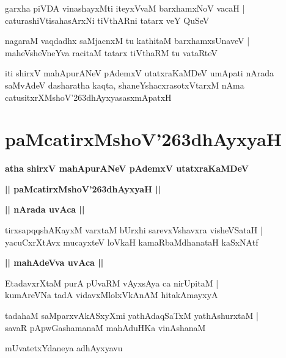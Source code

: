 \documentclass[twoside,12pt,openright]{book}
\def\S{\char'263}
\newcounter{shloka}[chapter]
\def\uvaca#1{\centerline{{\large\textbf{#1}}}}
\begin{document}
\begin{shloka}%
garxha piVDA vinashayxMti iteyxVvaM barxhamxNoV vacaH |\\
caturashiVtisahasArxNi tiVthARni tatarx veY QuSeV
\end{shloka}

\begin{shloka}%
nagaraM vaqdadhx saMjacnxM tu kathitaM barxhamxsUnaveV |\\
maheVsheVneYva racitaM tatarx tiVthaRM tu vataRteV
\end{shloka}

\begin{center}
iti shirxV mahApurANeV pAdemxV utatxraKaMDeV umApati nArada saMvAdeV  
dasharatha kaqta, shaneYshacxrasotxVtarxM nAma catusitxrXMshoV\S dhAyxyasasxmApatxH
\end{center}

\chapter{paMcatirxMshoV\S dhAyxyaH}

\begin{center}
{\LARGE\bfseries atha shirxV mahApurANeV pAdemxV utatxraKaMDeV}
\end{center}

\begin{center}
{\LARGE\bfseries || paMcatirxMshoV\S dhAyxyaH ||}
\end{center}

\uvaca{|| nArada uvAca ||}

\begin{shloka}%
tirxsapqqshAKayxM varxtaM bUrxhi sarevxVshavxra visheVSataH |\\
yacuCxrXtAvx mucayxteV loVkaH kamaRbaMdhanataH kaSxNAtf
\end{shloka}

\uvaca{|| mahAdeVva uvAca ||}

\begin{shloka}%
EtadavxrXtaM purA pUvaRM vAyxsAya ca nirUpitaM |\\
kumAreVNa tadA vidavxMlolxVkAnAM hitakAmayxyA
\end{shloka}

\begin{shloka}%
tadahaM saMparxvAkASxyXmi yathAdaqSaTxM yathAshurxtaM |\\
savaR pApwGashamanaM mahAduHKa vinAshanaM  
\end{shloka}

\begin{center}
mUvatetxYdaneya adhAyxyavu
\end{center}
\end{document}
